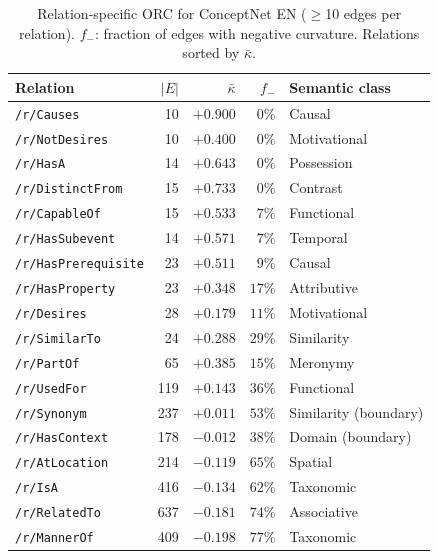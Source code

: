 \documentclass[11pt,a4paper]{article}
\newcommand{\kbar}{\bar{\kappa}}
\begin{document}
\begin{table}[h]
\centering
\small
\caption{Relation-specific ORC for ConceptNet EN ($\geq$10 edges per relation). $f_-$: fraction of edges with negative curvature. Relations sorted by $\kbar$.}
\label{tab:relation_orc}
\begin{tabular}{@{}lrrrl@{}}
\toprule
Relation & $|E|$ & $\kbar$ & $f_-$ & Semantic class \\
\midrule
\texttt{/r/Causes}          &  10 & $+0.900$ & $0\%$    & Causal \\
\texttt{/r/NotDesires}      &  10 & $+0.400$ & $0\%$    & Motivational \\
\texttt{/r/HasA}            &  14 & $+0.643$ & $0\%$    & Possession \\
\texttt{/r/DistinctFrom}    &  15 & $+0.733$ & $0\%$    & Contrast \\
\texttt{/r/CapableOf}       &  15 & $+0.533$ & $7\%$    & Functional \\
\texttt{/r/HasSubevent}     &  14 & $+0.571$ & $7\%$    & Temporal \\
\texttt{/r/HasPrerequisite} &  23 & $+0.511$ & $9\%$    & Causal \\
\texttt{/r/HasProperty}     &  23 & $+0.348$ & $17\%$   & Attributive \\
\texttt{/r/Desires}         &  28 & $+0.179$ & $11\%$   & Motivational \\
\texttt{/r/SimilarTo}       &  24 & $+0.288$ & $29\%$   & Similarity \\
\texttt{/r/PartOf}          &  65 & $+0.385$ & $15\%$   & Meronymy \\
\texttt{/r/UsedFor}         & 119 & $+0.143$ & $36\%$   & Functional \\
\texttt{/r/Synonym}         & 237 & $+0.011$ & $53\%$   & Similarity (boundary) \\
\texttt{/r/HasContext}      & 178 & $-0.012$ & $38\%$   & Domain (boundary) \\
\texttt{/r/AtLocation}      & 214 & $-0.119$ & $65\%$   & Spatial \\
\texttt{/r/IsA}             & 416 & $-0.134$ & $62\%$   & Taxonomic \\
\texttt{/r/RelatedTo}       & 637 & $-0.181$ & $74\%$   & Associative \\
\texttt{/r/MannerOf}        & 409 & $-0.198$ & $77\%$   & Taxonomic \\
\bottomrule
\end{tabular}
\end{table}
\end{document}
